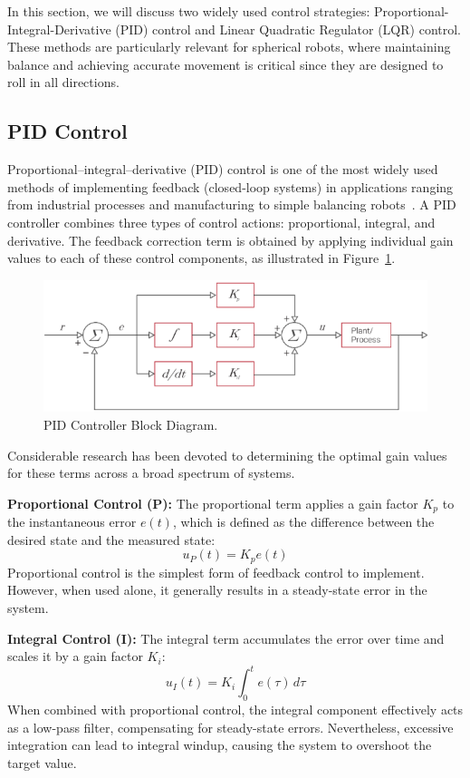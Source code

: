 \documentclass[english, bachelor, utf8]{base/thesis_telematics}
\begin{document}
In this section, we will discuss two widely used control strategies: Proportional-Integral-Derivative (PID) control and Linear Quadratic Regulator (LQR) control.
These methods are particularly relevant for spherical robots, where maintaining balance and achieving accurate movement is critical since they are designed to roll in all directions.
\subsection{PID Control}
Proportional–integral–derivative (PID) control is one of the most widely used methods of implementing feedback (closed-loop systems) in applications ranging from industrial processes and manufacturing to simple balancing robots~\cite{feedbackBook}. 
A PID controller combines three types of control actions: proportional, integral, and derivative. The feedback correction term is obtained by applying individual gain values to each of these control components, as illustrated in Figure~\ref{fig:pid_control}.
\begin{figure}[ht]
\centering
\includegraphics[width=0.7\columnwidth]{pics/pid_control.png}
\caption{PID Controller Block Diagram.~\cite{vectornav_math_controls}}
\label{fig:pid_control}
\end{figure}

Considerable research has been devoted to determining the optimal gain values for these terms across a broad spectrum of systems.

\textbf{Proportional Control (P):}  
The proportional term applies a gain factor $K_p$ to the instantaneous error $e(t)$, which is defined as the difference between the desired state and the measured state:
\begin{equation}
    u_P(t) = K_p e(t)
    \label{eq:P}
\end{equation}
Proportional control is the simplest form of feedback control to implement. However, when used alone, it generally results in a steady-state error in the system.

\textbf{Integral Control (I):}  
The integral term accumulates the error over time and scales it by a gain factor $K_i$:
\begin{equation}
    u_I(t) = K_i \int_{0}^{t} e(\tau) \, d\tau
    \label{eq:I}
\end{equation}
When combined with proportional control, the integral component effectively acts as a low-pass filter, compensating for steady-state errors. Nevertheless, excessive integration can lead to integral windup, causing the system to overshoot the target value.
\end{document}

